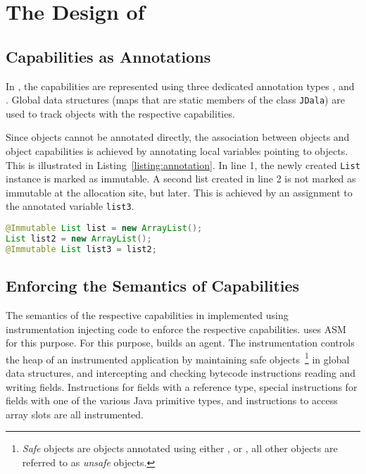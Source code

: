 \section{The Design of \jdala}
\label{sec:design}	


\subsection{Capabilities as Annotations}
\label{subsection:capabilitesAsAnnotations}

In \jdala, the \dala capabilities are represented using three dedicated annotation types \Immutable, \Isolated and \Local.  Global data structures (maps that are static members of the class \texttt{JDala}) are used to track objects with the respective capabilities.   

Since objects cannot be annotated directly, the association between objects and object capabilities is achieved by annotating local variables pointing to objects.  This is illustrated in Listing~\ref{listing:annotation}.  In line 1, the newly created \texttt{List} instance is marked as immutable.  A second list created in line 2 is not marked as immutable at the allocation site, but later. This is achieved by an assignment to the annotated variable \texttt{list3}. 


\begin{lstlisting}[language=Java, caption=Associating objects with capabilities, label=listing:annotation]
@Immutable List list = new ArrayList();
List list2 = new ArrayList();
@Immutable List list3 = list2;
\end{lstlisting}


\subsection{Enforcing the Semantics of Capabilities}

The semantics of the respective capabilities in implemented using instrumentation injecting code to enforce the respective capabilities. 
\jdala uses ASM~\cite{bruneton2002asm} for this purpose.
For this purpose, \jdala builds an agent. The instrumentation controls the heap of an instrumented application by maintaining safe objects~\footnote{\textit{Safe} objects are objects annotated using either \Immutable, \Isolated or \Local, all other objects are referred to as \textit{unsafe} objects.} in global data structures, and intercepting and checking bytecode instructions reading and writing fields.  Instructions for fields with a reference type, special instructions for fields with one of the various Java primitive types, and instructions to access array slots are all instrumented. 

